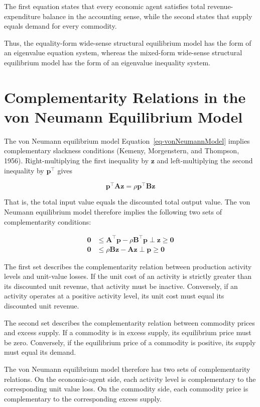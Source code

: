 \documentclass[
  letterpaper,
  DIV=11,
  numbers=noendperiod]{scrreprt}
\begin{document}
The first equation states that every economic agent satisfies total
revenue-expenditure balance in the accounting sense, while the second
states that supply equals demand for every commodity.

Thus, the equality-form wide-sense structural equilibrium model has the
form of an eigenvalue equation system, whereas the mixed-form wide-sense
structural equilibrium model has the form of an eigenvalue inequality
system.

\section{Complementarity Relations in the von Neumann Equilibrium
Model}\label{complementarity-relations-in-the-von-neumann-equilibrium-model}

The von Neumann equilibrium model Equation~\ref{eq-vonNeumannModel}
implies complementary slackness conditions (Kemeny, Morgenstern, and
Thompson, 1956). Right-multiplying the first inequality by \(\mathbf z\)
and left-multiplying the second inequality by \(\mathbf p^{\top}\) gives

\[
\mathbf p^{\top}\mathbf A\mathbf z
=
\rho\mathbf p^{\top}\mathbf B\mathbf z
\]

That is, the total input value equals the discounted total output value.
The von Neumann equilibrium model therefore implies the following two
sets of complementarity conditions:

\[
\begin{aligned}
\mathbf 0
&\leq
\mathbf A^{\top}\mathbf p-\rho\mathbf B^{\top}\mathbf p
\perp
\mathbf z
\geq
\mathbf 0\\
\mathbf 0
&\leq
\rho\mathbf B\mathbf z-\mathbf A\mathbf z
\perp
\mathbf p
\geq
\mathbf 0
\end{aligned}
\]

The first set describes the complementarity relation between production
activity levels and unit-value losses. If the unit cost of an activity
is strictly greater than its discounted unit revenue, that activity must
be inactive. Conversely, if an activity operates at a positive activity
level, its unit cost must equal its discounted unit revenue.

The second set describes the complementarity relation between commodity
prices and excess supply. If a commodity is in excess supply, its
equilibrium price must be zero. Conversely, if the equilibrium price of
a commodity is positive, its supply must equal its demand.

The von Neumann equilibrium model therefore has two sets of
complementarity relations. On the economic-agent side, each activity
level is complementary to the corresponding unit value loss. On the
commodity side, each commodity price is complementary to the
corresponding excess supply.
\end{document}
